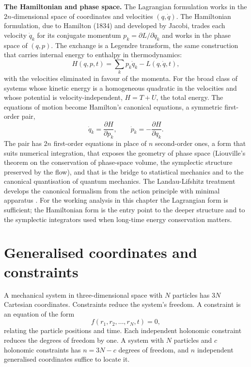 \begin{mastery}
\textbf{The Hamiltonian and phase space.} The Lagrangian formulation
works in the $2n$-dimensional space of coordinates and velocities
$(q, \dot{q})$. The Hamiltonian formulation, due to Hamilton (1834) and
developed by Jacobi, trades each velocity $\dot{q}_k$ for its conjugate
momentum $p_k = \partial L/\partial\dot{q}_k$ and works in the phase
space of $(q, p)$. The exchange is a Legendre transform, the same
construction that carries internal energy to enthalpy in
thermodynamics:
\[
H(q, p, t) = \sum_k p_k \dot{q}_k - L(q, \dot{q}, t),
\]
with the velocities eliminated in favour of the momenta. For the broad
class of systems whose kinetic energy is a homogeneous quadratic in the
velocities and whose potential is velocity-independent, $H = T + U$,
the total energy. The equations of motion become Hamilton's canonical
equations, a symmetric first-order pair,
\[
\dot{q}_k = \frac{\partial H}{\partial p_k},
\qquad
\dot{p}_k = -\frac{\partial H}{\partial q_k}.
\]
The pair has $2n$ first-order equations in place of $n$ second-order
ones, a form that suits numerical integration, that exposes the
geometry of phase space (Liouville's theorem on the conservation of
phase-space volume, the symplectic structure preserved by the flow),
and that is the bridge to statistical mechanics and to the canonical
quantisation of quantum mechanics. The Landau-Lifshitz treatment
develops the canonical formalism from the action principle with minimal
apparatus \cite{text:landau-mechanics}. For the working analysis in
this chapter the Lagrangian form is sufficient; the Hamiltonian form is
the entry point to the deeper structure and to the symplectic
integrators used when long-time energy conservation matters.
\end{mastery}

\section{Generalised coordinates and constraints}

A mechanical system in three-dimensional space with $N$ particles
has $3N$ Cartesian coordinates. Constraints reduce the system's
freedom. A  constraint is an equation of the form
\[
f(r_1, r_2, \ldots, r_N, t) = 0,
\]
relating the particle positions and time. Each independent holonomic
constraint reduces the degrees of freedom by one. A system with $N$
particles and $c$ holonomic constraints has $n = 3N - c$ degrees of
freedom, and $n$ independent generalised coordinates suffice to
locate it.

